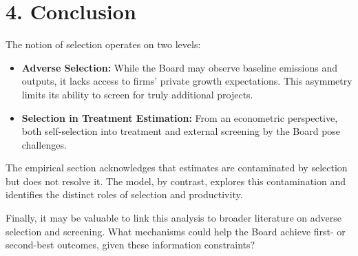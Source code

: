 \documentclass[12pt]{article}[margin=1in]
\begin{document}
\section*{4. Conclusion}

The notion of selection operates on two levels:

\begin{itemize}
    \item \textbf{Adverse Selection:} While the Board may observe baseline emissions and outputs, it lacks access to firms’ private growth expectations. This asymmetry limits its ability to screen for truly additional projects.
    \item \textbf{Selection in Treatment Estimation:} From an econometric perspective, both self-selection into treatment and external screening by the Board pose challenges.
\end{itemize}

The empirical section acknowledges that estimates are contaminated by selection but does not resolve it. The model, by contrast, explores this contamination and identifies the distinct roles of selection and productivity.

Finally, it may be valuable to link this analysis to broader literature on adverse selection and screening. What mechanisms could help the Board achieve first- or second-best outcomes, given these information constraints?


\pagebreak \newpage 
\end{document}
